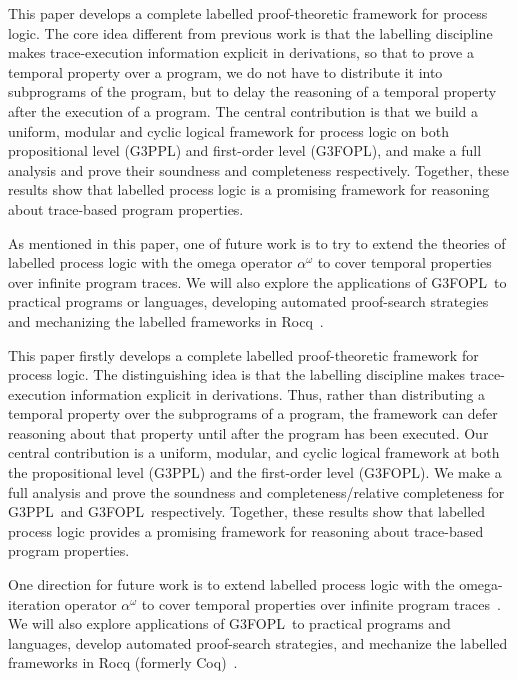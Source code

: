 \documentclass[manuscript,screen]{acmart}
\newcommand{\GiiiPPLcyc}[0]{\mbox{G3PPL}}
\newcommand{\GiiiFOPLcyc}[0]{\mbox{G3FOPL}}
\begin{document}
\ifx
This paper develops a complete labelled proof-theoretic framework for process logic. 
The core idea different from previous work is that the labelling discipline makes trace-execution information explicit in derivations, so that to prove a temporal property over a program, we do not have to distribute it into subprograms of the program, but to delay the reasoning of a temporal property after the execution of a program. 
The central contribution is that we build a uniform, modular and cyclic logical framework for process logic on both propositional level (\GiiiPPLcyc) and first-order level (\GiiiFOPLcyc), and make a full analysis and prove their soundness and completeness respectively. 
Together, these results show that labelled process logic is a promising framework for reasoning about trace-based program properties. 

As mentioned in this paper, one of future work is to try to extend the theories of labelled process logic with the omega operator $\alpha^\omega$ to cover temporal properties over infinite program traces. 
We will also explore the applications of \GiiiFOPLcyc\ to practical programs or languages, developing automated proof-search strategies and mechanizing the labelled frameworks in Rocq~\cite{???}. 
\fi

This paper firstly develops a complete labelled proof-theoretic framework for process logic. 
The distinguishing idea is that the labelling discipline makes trace-execution information explicit in derivations. Thus, rather than distributing a temporal property over the subprograms of a program, the framework can defer reasoning about that property until after the program has been executed.
Our central contribution is a uniform, modular, and cyclic logical framework at both the propositional level (\GiiiPPLcyc) and the first-order level (\GiiiFOPLcyc). We make a full analysis and prove the soundness and completeness/relative completeness for \GiiiPPLcyc\ and \GiiiFOPLcyc\ respectively. 
Together, these results show that labelled process logic provides a promising framework for reasoning about trace-based program properties.

One direction for future work is to extend labelled process logic with the omega-iteration operator $\alpha^\omega$ to cover temporal properties over infinite program traces~\cite{Harel00}.
We will also explore applications of \GiiiFOPLcyc\ to practical programs and languages, develop automated proof-search strategies, and mechanize the labelled frameworks in Rocq (formerly Coq)~\cite{Bertot04}.
\end{document}
